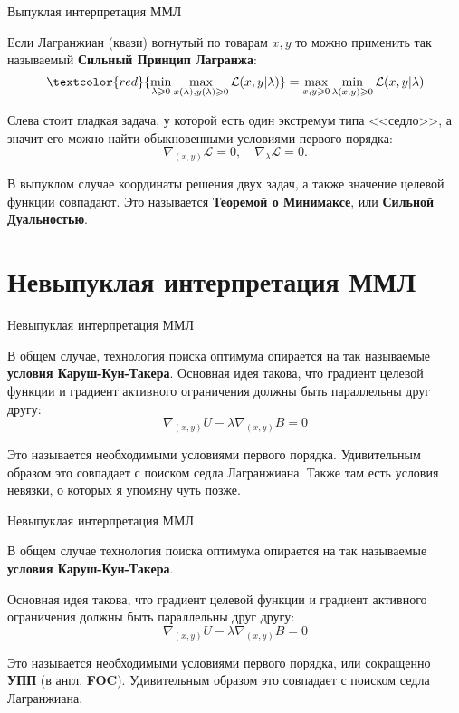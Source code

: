 \documentclass{beamer}
\begin{document}
\begin{frame}{Выпуклая интерпретация ММЛ}

Если Лагранжиан (квази) вогнутый по товарам $x,y$ то можно применить так называемый \textbf{Сильный Принцип Лагранжа}:
$$ \textcolor{red}{\min_{\lambda \geqslant 0} \max_{x(\lambda),y(\lambda) \geqslant 0} \mathcal{L}(x,y | \lambda)} =  \max_{x,y \geqslant 0} \min_{\lambda(x,y) \geqslant 0} \mathcal{L}(x,y | \lambda) $$ 

Слева стоит гладкая задача, у которой есть один экстремум типа <<седло>>, а значит его можно найти обыкновенными условиями первого порядка:
$$ \nabla_{(x,y)} \mathcal{L} = 0, \quad \nabla_{\lambda} \mathcal{L} = 0.$$

В выпуклом случае координаты решения двух задач, а также значение целевой функции совпадают. Это называется \textbf{Теоремой о Минимаксе}, или \textbf{Сильной Дуальностью}.

\end{frame}

\section{Невыпуклая интерпретация ММЛ}

\begin{frame}{Невыпуклая интерпретация ММЛ}

В общем случае, технология поиска оптимума опирается на так называемые \textbf{условия Каруш-Кун-Такера}. Основная идея такова, что градиент целевой функции и градиент активного ограничения должны быть параллельны друг другу:
$$ \nabla_{(x,y)}U - \lambda \nabla_{(x,y)} B = 0$$

Это называется необходимыми условиями первого порядка. Удивительным образом это совпадает с поиском седла Лагранжиана. Также там есть условия невязки, о которых я упомяну чуть позже.

\end{frame}

\begin{frame}{Невыпуклая интерпретация ММЛ}

В общем случае технология поиска оптимума опирается на так называемые \textbf{условия Каруш-Кун-Такера}. 

Основная идея такова, что градиент целевой функции и градиент активного ограничения должны быть параллельны друг другу:
$$ \nabla_{(x,y)}U - \lambda \nabla_{(x,y)} B = 0$$

Это называется необходимыми условиями первого порядка, или сокращенно \textbf{УПП} (в англ. \textbf{FOC}). Удивительным образом это совпадает с поиском седла Лагранжиана.

\end{frame}
\end{document}
